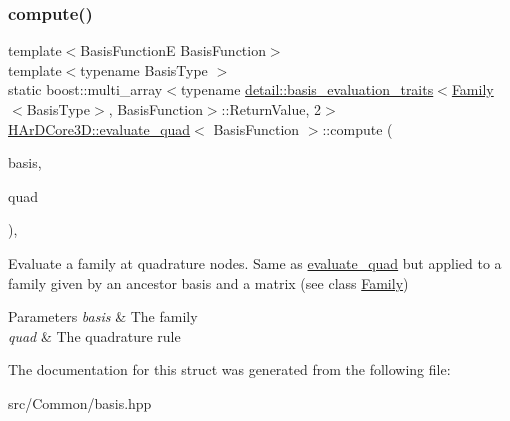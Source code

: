 \subsubsection{\texorpdfstring{compute()}{compute()}\hspace{0.1cm}{\footnotesize\ttfamily [2/2]}}
{\footnotesize\ttfamily template$<$Basis\+FunctionE Basis\+Function$>$ \\
template$<$typename Basis\+Type $>$ \\
static boost\+::multi\+\_\+array$<$typename \hyperlink{structHArDCore3D_1_1detail_1_1basis__evaluation__traits}{detail\+::basis\+\_\+evaluation\+\_\+traits}$<$\hyperlink{classHArDCore3D_1_1Family}{Family}$<$Basis\+Type$>$, Basis\+Function$>$\+::Return\+Value, 2$>$ \hyperlink{structHArDCore3D_1_1evaluate__quad}{H\+Ar\+D\+Core3\+D\+::evaluate\+\_\+quad}$<$ Basis\+Function $>$\+::compute (\begin{DoxyParamCaption}\item[{const \hyperlink{classHArDCore3D_1_1Family}{Family}$<$ Basis\+Type $>$ \&}]{basis,  }\item[{const Quadrature\+Rule \&}]{quad }\end{DoxyParamCaption})\hspace{0.3cm}{\ttfamily [inline]}, {\ttfamily [static]}}

Evaluate a family at quadrature nodes. Same as \textquotesingle{}\hyperlink{structHArDCore3D_1_1evaluate__quad}{evaluate\+\_\+quad}\textquotesingle{} but applied to a family given by an ancestor basis and a matrix (see class \textquotesingle{}\hyperlink{classHArDCore3D_1_1Family}{Family}\textquotesingle{}) 
\begin{DoxyParams}{Parameters}
{\em basis} & The family \\
\hline
{\em quad} & The quadrature rule \\
\hline
\end{DoxyParams}


The documentation for this struct was generated from the following file\+:\begin{DoxyCompactItemize}
\item 
src/\+Common/basis.\+hpp\end{DoxyCompactItemize}
